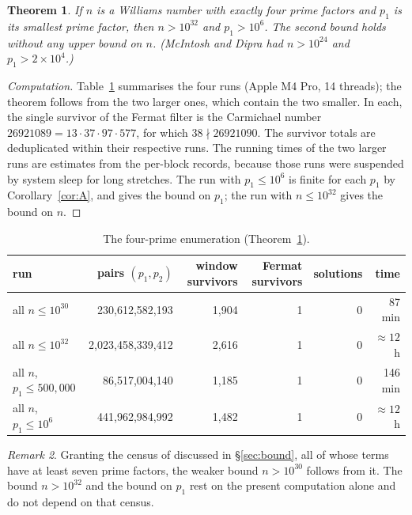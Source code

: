 \documentclass[11pt]{amsart}
\newtheorem{theorem}{Theorem}[section]
\theoremstyle{definition}
\theoremstyle{remark}
\newtheorem{remark}[theorem]{Remark}
\begin{document}
\begin{theorem}\label{thm:B}
If $n$ is a Williams number with exactly four prime factors and $p_1$ is its smallest prime factor, then $n>10^{32}$ and $p_1>10^{6}$. The second bound holds without any upper bound on $n$. (McIntosh and Dipra \cite{MD15} had $n>10^{24}$ and $p_1>2\times10^4$.)
\end{theorem}

\begin{proof}[Computation]
Table~\ref{tab:k4} summarises the four runs (Apple M4 Pro, 14 threads); the theorem follows from the two larger ones, which contain the two smaller. In each, the single survivor of the Fermat filter is the Carmichael number $26921089=13\cdot37\cdot97\cdot577$, for which $38\nmid26921090$. The survivor totals are deduplicated within their respective runs. The running times of the two larger runs are estimates from the per-block records, because those runs were suspended by system sleep for long stretches. The run with $p_1\le10^6$ is finite for each $p_1$ by Corollary~\ref{cor:A}, and gives the bound on $p_1$; the run with $n\le10^{32}$ gives the bound on $n$.
\end{proof}

\begin{table}[h]
\centering\small
\begin{tabular}{lrrrrr}
\toprule
run & pairs $(p_1,p_2)$ & window survivors & Fermat survivors & solutions & time\\
\midrule
all $n\le10^{30}$ & 230{,}612{,}582{,}193 & 1{,}904 & 1 & 0 & 87 min\\
all $n\le10^{32}$ & 2{,}023{,}458{,}339{,}412 & 2{,}616 & 1 & 0 & $\approx12$ h\\
all $n$, $p_1\le500{,}000$ & 86{,}517{,}004{,}140 & 1{,}185 & 1 & 0 & 146 min\\
all $n$, $p_1\le10^{6}$ & 441{,}962{,}984{,}992 & 1{,}482 & 1 & 0 & $\approx12$ h\\
\bottomrule
\end{tabular}
\caption{The four-prime enumeration (Theorem~\ref{thm:B}).}\label{tab:k4}
\end{table}

\begin{remark}
Granting the census of \cite{Pud30} discussed in \S\ref{sec:bound}, all of whose terms have at least seven prime factors, the weaker bound $n>10^{30}$ follows from it. The bound $n>10^{32}$ and the bound on $p_1$ rest on the present computation alone and do not depend on that census.
\end{remark}
\end{document}
